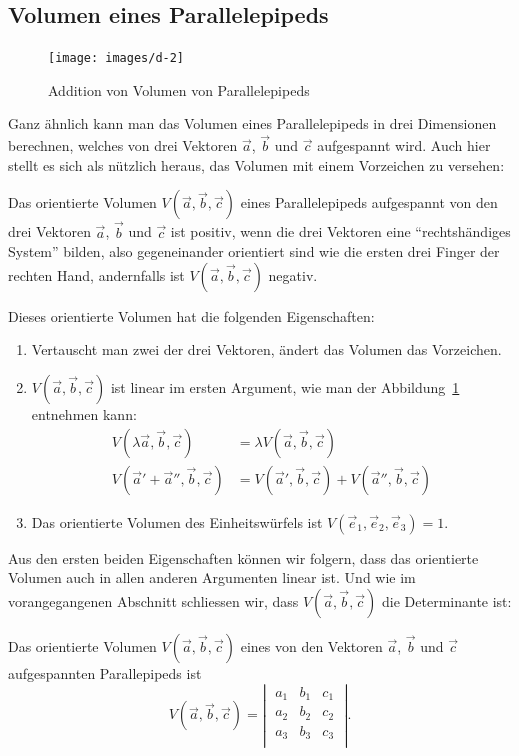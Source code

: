 \subsection{Volumen eines Parallelepipeds}
\begin{figure}
\begin{center}
\texttt{[image: images/d-2]}
\end{center}
\caption{Addition von Volumen von Parallelepipeds\label{image-volumina}}
\end{figure}
Ganz ähnlich kann man das Volumen eines Parallelepipeds in drei Dimensionen
berechnen, welches von drei Vektoren $\vec a$, $\vec b$ und $\vec c$
aufgespannt wird.
Auch hier stellt es sich als nützlich heraus,
das Volumen mit einem Vorzeichen zu versehen:
\begin{definition}
Das orientierte Volumen
$V(\vec a,\vec b,\vec c)$
eines Parallelepipeds aufgespannt von den drei
Vektoren
$\vec a$, $\vec b$ und $\vec c$ ist positiv, wenn die drei Vektoren
eine ``rechtshändiges System'' bilden, also gegeneinander orientiert
sind wie die ersten drei Finger der rechten Hand, andernfalls ist
$V(\vec a,\vec b,\vec c)$ negativ.
\end{definition}
Dieses orientierte Volumen hat die folgenden Eigenschaften:
\begin{enumerate}
\item Vertauscht man zwei der drei Vektoren, ändert das Volumen das Vorzeichen.
\item $V(\vec a,\vec b,\vec c)$ ist linear im ersten Argument, wie man
der Abbildung~\ref{image-volumina} entnehmen kann:
\begin{align*}
V(\lambda\vec a,\vec b,\vec c)
&=
\lambda V(\vec a,\vec b,\vec c)
\\
V(\vec a'+\vec a'',\vec b,\vec c)
&=
V(\vec a',\vec b,\vec c)
+
V(\vec a'',\vec b,\vec c)
\end{align*}
\item Das orientierte Volumen des Einheitswürfels ist
$V(\vec e_1,\vec e_2,\vec e_3)=1$.
\end{enumerate}
Aus den ersten beiden Eigenschaften können wir folgern, dass das orientierte
Volumen auch in allen anderen Argumenten linear ist.
Und wie im vorangegangenen Abschnitt schliessen wir,
dass $V(\vec a,\vec b,\vec c)$ die Determinante ist:
\begin{satz}
Das orientierte Volumen $V(\vec a,\vec b,\vec c)$ eines von den Vektoren
$\vec a$, $\vec b$ und $\vec c$ aufgespannten Parallepipeds  ist
\[
V(\vec a,\vec b,\vec c)=\left|\;\begin{matrix}
a_1&b_1&c_1\\
a_2&b_2&c_2\\
a_3&b_3&c_3\\
\end{matrix}\;\right|.
\]
\end{satz}

